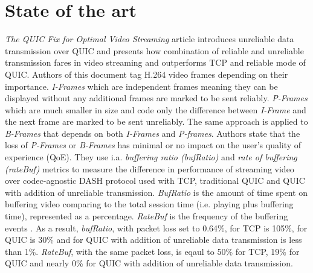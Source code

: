 \section{State of the art}
\label{sec:state-of-the-art}

\textit{The QUIC Fix for Optimal Video Streaming} article \cite{the-quic-fix-for-optimal-video-streaming} introduces unreliable data transmission over QUIC and presents how combination of reliable and unreliable transmission fares in video streaming and outperforms TCP and reliable mode of QUIC.
Authors of this document tag H.264 video frames depending on their importance.
\textit{I-Frames} which are independent frames meaning they can be displayed without any additional frames are marked to be sent reliably.
\textit{P-Frames} which are much smaller in size and code only the difference between \textit{I-Frame} and the next frame are marked to be sent unreliably.
The same approach is applied to \textit{B-Frames} that depends on both \textit{I-Frames} and \textit{P-frames}.
Authors state that the loss of \textit{P-Frames} or \textit{B-Frames} has minimal or no impact on the user's quality of experience (QoE).
They use i.a. \textit{buffering ratio (bufRatio)} and \textit{rate of buffering (rateBuf)} metrics to measure the difference in performance of streaming video over codec-agnostic DASH protocol used with TCP, traditional QUIC and QUIC with addition of unreliable transmission.
\textit{BufRatio} is the amount of time spent on buffering video comparing to the total session time (i.e. playing plus buffering time), represented as a percentage.
\textit{RateBuf} is the frequency of the buffering events \cite{impact-of-video-quality-on-user-engagement}.
As a result, \textit{bufRatio}, with packet loss set to 0.64\%, for TCP is 105\%, for QUIC is 30\% and for QUIC with addition of unreliable data transmission is less than 1\%.
\textit{RateBuf}, with the same packet loss, is eqaul to 50\% for TCP, 19\% for QUIC and nearly 0\% for QUIC with addition of unreliable data transmission.

